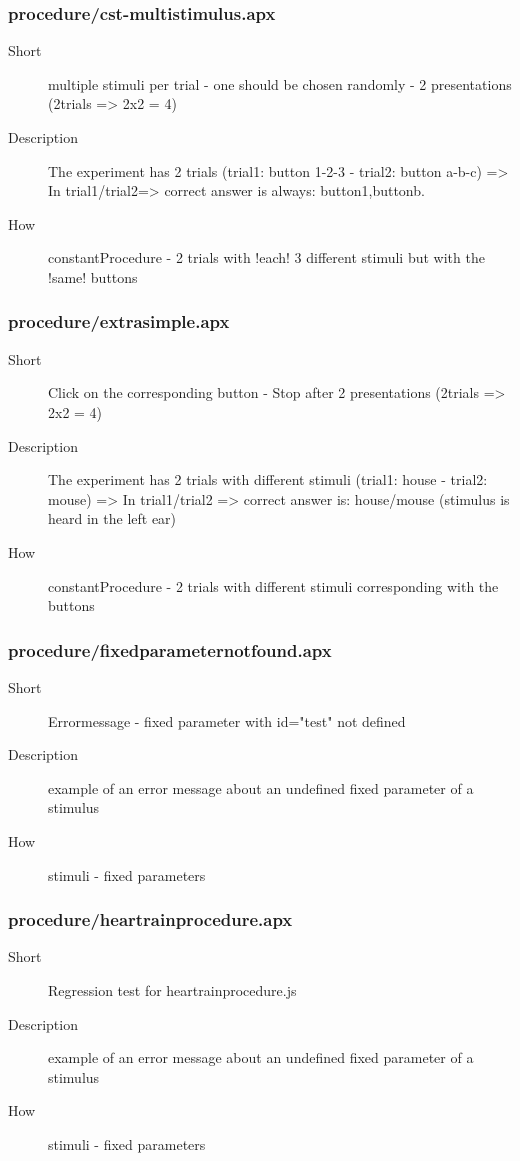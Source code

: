 \subsubsection{procedure/cst-multistimulus.apx}
\begin{description}
\item[Short] 
 multiple stimuli per trial - one should be chosen randomly - 2 presentations (2trials =\textgreater{} 2x2 = 4)
\item[Description] 
 The experiment has 2 trials (trial1: button 1-2-3 - trial2: button a-b-c) =\textgreater{} In trial1/trial2=\textgreater{} correct answer is always: button1,buttonb.
\item[How] 
 constantProcedure - 2 trials with !each! 3 different stimuli but with the !same! buttons
\end{description}

\subsubsection{procedure/extrasimple.apx}
\begin{description}
\item[Short] 
 Click on the corresponding button - Stop after 2 presentations (2trials =\textgreater{} 2x2 = 4)
\item[Description] 
 The experiment has 2 trials with different stimuli (trial1: house - trial2: mouse) =\textgreater{} In trial1/trial2 =\textgreater{} correct answer is: house/mouse (stimulus is heard in the left ear)
\item[How] 
 constantProcedure - 2 trials with different stimuli corresponding with the buttons
\end{description}

\subsubsection{procedure/fixedparameternotfound.apx}
\begin{description}
\item[Short] 
 Errormessage - fixed parameter with id="test" not defined
\item[Description] 
 example of an error message about an undefined fixed parameter of a stimulus
\item[How] 
 stimuli - fixed parameters
\end{description}

\subsubsection{procedure/heartrainprocedure.apx}
\begin{description}
\item[Short] 
 Regression test for heartrainprocedure.js
\item[Description] 
 example of an error message about an undefined fixed parameter of a stimulus
\item[How] 
 stimuli - fixed parameters
\end{description}

